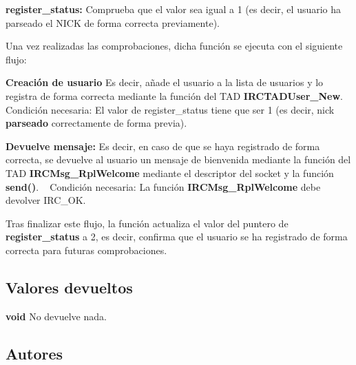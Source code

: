 \begin{DoxyItemize}
\item {\bfseries register\+\_\+status\+:} Comprueba que el valor sea igual a 1 (es decir, el usuario ha parseado el N\+I\+C\+K de forma correcta previamente). 
\end{DoxyItemize}

Una vez realizadas las comprobaciones, dicha función se ejecuta con el siguiente flujo\+:


\begin{DoxyItemize}
\item {\bfseries Creación de usuario} Es decir, añade el usuario a la lista de usuarios y lo registra de forma correcta mediante la función del T\+A\+D {\bfseries I\+R\+C\+T\+A\+D\+User\+\_\+\+New}. ~\newline
Condición necesaria\+: El valor de register\+\_\+status tiene que ser 1 (es decir, nick {\bfseries parseado} correctamente de forma previa).  
\item {\bfseries Devuelve mensaje\+:} Es decir, en caso de que se haya registrado de forma correcta, se devuelve al usuario un mensaje de bienvenida mediante la función del T\+A\+D {\bfseries I\+R\+C\+Msg\+\_\+\+Rpl\+Welcome} mediante el descriptor del socket y la función {\bfseries send()}. ~\newline
Condición necesaria\+: La función {\bfseries I\+R\+C\+Msg\+\_\+\+Rpl\+Welcome} debe devolver I\+R\+C\+\_\+\+O\+K.  
\end{DoxyItemize}

Tras finalizar este flujo, la función actualiza el valor del puntero de {\bfseries register\+\_\+status} a 2, es decir, confirma que el usuario se ha registrado de forma correcta para futuras comprobaciones. \hypertarget{server_command_user_return_user}{}\subsection{Valores devueltos}\label{server_command_user_return_user}

\begin{DoxyItemize}
\item {\bfseries void} No devuelve nada. 
\end{DoxyItemize}\hypertarget{server_command_user_authors_user}{}\subsection{Autores}\label{server_command_user_authors_user}

